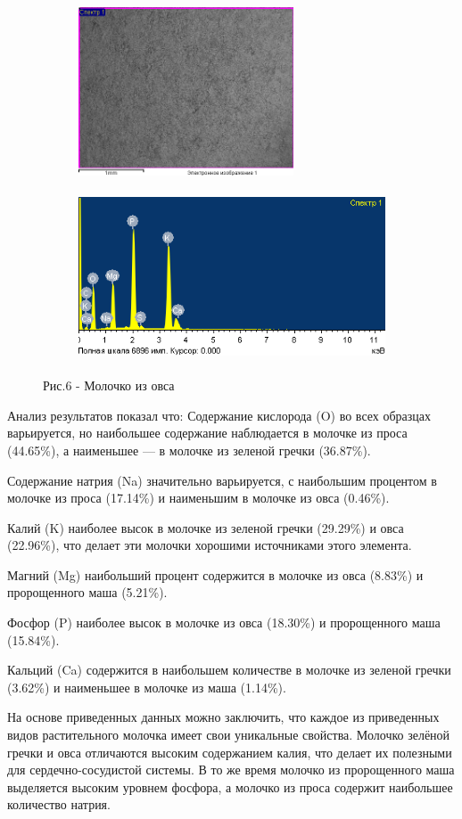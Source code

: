 \begin{figure}[H]
	\centering
	\begin{subfigure}{0.4\textwidth}
		\centering
		\includegraphics[height=5cm]{media/pish/image55}
	\end{subfigure}
	\hfill
	\begin{subfigure}{0.55\textwidth}
		\centering
		\includegraphics[height=5cm]{media/pish/image56}
	\end{subfigure}
	\caption*{Рис.6 - Молочко из овса}
\end{figure}

\begin{multicols}{2}
Анализ результатов показал что: Содержание кислорода (O) во всех
образцах варьируется, но наибольшее содержание наблюдается в молочке из
проса (44.65\%), а наименьшее --- в молочке из зеленой гречки (36.87\%).

Содержание натрия (Na) значительно варьируется, с наибольшим процентом в
молочке из проса (17.14\%) и наименьшим в молочке из овса (0.46\%).

Калий (K) наиболее высок в молочке из зеленой гречки (29.29\%) и овса
(22.96\%), что делает эти молочки хорошими источниками этого элемента.

Магний (Mg) наибольший процент содержится в молочке из овса (8.83\%) и
пророщенного маша (5.21\%).

Фосфор (P) наиболее высок в молочке из овса (18.30\%) и пророщенного
маша (15.84\%).

Кальций (Ca) содержится в наибольшем количестве в молочке из зеленой
гречки (3.62\%) и наименьшее в молочке из маша (1.14\%).

На основе приведенных данных можно заключить, что каждое из приведенных
видов растительного молочка имеет свои уникальные свойства. Молочко
зелёной гречки и овса отличаются высоким содержанием калия, что делает
их полезными для сердечно-сосудистой системы. В то же время молочко из
пророщенного маша выделяется высоким уровнем фосфора, а молочко из проса
содержит наибольшее количество натрия.
\end{multicols}

